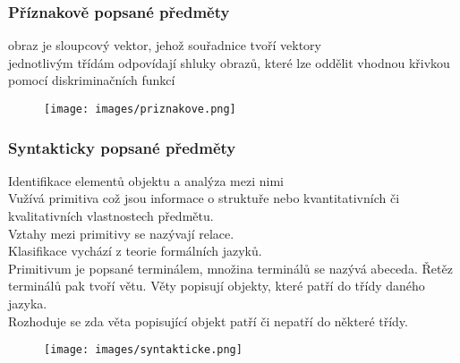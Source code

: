 \subsubsection{Příznakově popsané předměty}
obraz je sloupcový vektor, jehož souřadnice tvoří vektory\\
jednotlivým třídám odpovídají shluky obrazů, které lze oddělit vhodnou křivkou pomocí diskriminačních funkcí

\begin{figure}[H]
    \texttt{[image: images/priznakove.png]}
\end{figure}

\subsubsection{Syntakticky popsané předměty}

Identifikace elementů objektu a analýza mezi nimi\\
Vužívá primitiva což jsou informace o struktuře nebo kvantitativních či kvalitativních vlastnostech předmětu.\\
Vztahy mezi primitivy se nazývají relace.\\
Klasifikace vychází z teorie formálních jazyků.\\
Primitivum je popsané terminálem, množina terminálů se nazývá abeceda. Řetěz terminálů pak tvoří větu. Věty popisují objekty, které patří do třídy daného jazyka.\\
Rozhoduje se zda věta popisující objekt patří či nepatří do některé třídy.\\
\begin{figure}[H]
    \texttt{[image: images/syntakticke.png]}
\end{figure}

